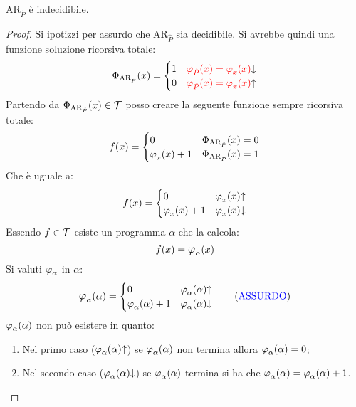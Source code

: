 \begin{theorem}\label{theo:arrestoP}
    $\text{AR}_{\hat{P}}$ è indecidibile.
\end{theorem}
\begin{proof}
    Si ipotizzi per assurdo che $\text{AR}_{\hat{P}}$ sia decidibile. Si avrebbe quindi
    una funzione soluzione ricorsiva totale:
    $$ \fsol[\text{AR}_{\hat{P}}](x) =
    \begin{cases}
        1 & {\color{red}\semRAM_{\hat{P}}(x)=\semRAM_x(x)}\termina\\
        0 & {\color{red}\semRAM_{\hat{P}}(x)=\semRAM_x(x)}\text{\textuparrow}
    \end{cases} $$
    Partendo da $\fsol[\text{AR}_{\hat{P}}](x)\in\ricTot$ posso creare la seguente
    funzione sempre ricorsiva totale:
    $$ f(x) = \begin{cases}
        0 & \fsol[\text{AR}_{\hat{P}}](x)=0\\
        \semRAM_x(x)+1 & \fsol[\text{AR}_{\hat{P}}](x)=1
    \end{cases} $$
    Che è uguale a:
    $$ f(x) = \begin{cases}
        0 & \semRAM_x(x)\text{\textuparrow}\\
        \semRAM_x(x)+1 & \semRAM_x(x)\termina
    \end{cases} $$
    Essendo $f\in\ricTot$ esiste un programma $\alpha$ che la calcola:
    $$ f(x) = \semRAM_\alpha(x) $$
    Si valuti $\semRAM_\alpha$ in $\alpha$:
    \begin{equation} \semRAM_\alpha(\alpha) = \begin{cases}
        0 & \semRAM_\alpha(\alpha)\text{\textuparrow}\\
        \semRAM_\alpha(\alpha)+1 & \semRAM_\alpha(\alpha)\termina
    \end{cases}\tag{{\color{blue}ASSURDO}}\end{equation}
    $\semRAM_\alpha(\alpha)$ non può esistere in quanto:
    \begin{enumerate}
        \item Nel primo caso ($\semRAM_\alpha(\alpha)\text{\textuparrow}$) se 
            {\color{blue} $\semRAM_\alpha(\alpha)$ non termina allora 
            $\semRAM_\alpha(\alpha)=0$};
        \item Nel secondo caso ($\semRAM_\alpha(\alpha)\termina$) se
            $\semRAM_\alpha(\alpha)$ termina si ha che 
            {\color{blue}$\semRAM_\alpha(\alpha)=\semRAM_\alpha(\alpha)+1$}.
    \end{enumerate}
\end{proof}
